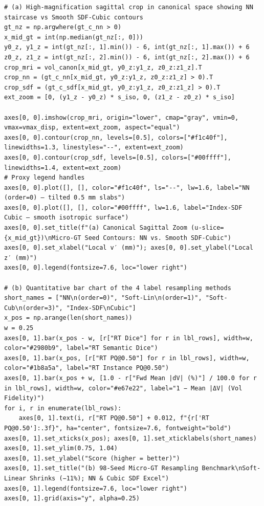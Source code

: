 \documentclass[10pt,a4paper]{article}
\renewcommand{\_}{\origunderscore\allowbreak}
\begin{document}
\begin{codebox}
\begin{lstlisting}[style=pybmed]
# (a) High-magnification sagittal crop in canonical space showing NN staircase vs Smooth SDF-Cubic contours
gt_nz = np.argwhere(gt_c_nn > 0)
x_mid_gt = int(np.median(gt_nz[:, 0]))
y0_z, y1_z = int(gt_nz[:, 1].min()) - 6, int(gt_nz[:, 1].max()) + 6
z0_z, z1_z = int(gt_nz[:, 2].min()) - 6, int(gt_nz[:, 2].max()) + 6
crop_mri = vol_canon[x_mid_gt, y0_z:y1_z, z0_z:z1_z].T
crop_nn = (gt_c_nn[x_mid_gt, y0_z:y1_z, z0_z:z1_z] > 0).T
crop_sdf = (gt_c_sdf[x_mid_gt, y0_z:y1_z, z0_z:z1_z] > 0).T
ext_zoom = [0, (y1_z - y0_z) * s_iso, 0, (z1_z - z0_z) * s_iso]

axes[0, 0].imshow(crop_mri, origin="lower", cmap="gray", vmin=0, vmax=vmax_disp, extent=ext_zoom, aspect="equal")
axes[0, 0].contour(crop_nn, levels=[0.5], colors=["#f1c40f"], linewidths=1.3, linestyles="--", extent=ext_zoom)
axes[0, 0].contour(crop_sdf, levels=[0.5], colors=["#00ffff"], linewidths=1.4, extent=ext_zoom)
# Proxy legend handles
axes[0, 0].plot([], [], color="#f1c40f", ls="--", lw=1.6, label="NN (order=0) — tilted 0.5 mm slabs")
axes[0, 0].plot([], [], color="#00ffff", lw=1.6, label="Index-SDF Cubic — smooth isotropic surface")
axes[0, 0].set_title(f"(a) Canonical Sagittal Zoom (u-slice={x_mid_gt})\nMicro-GT Seed Contours: NN vs. Smooth SDF-Cubic")
axes[0, 0].set_xlabel("Local v′ (mm)"); axes[0, 0].set_ylabel("Local z′ (mm)")
axes[0, 0].legend(fontsize=7.6, loc="lower right")

# (b) Quantitative bar chart of the 4 label resampling methods
short_names = ["NN\n(order=0)", "Soft-Lin\n(order=1)", "Soft-Cub\n(order=3)", "Index-SDF\nCubic"]
x_pos = np.arange(len(short_names))
w = 0.25
axes[0, 1].bar(x_pos - w, [r["RT Dice"] for r in lbl_rows], width=w, color="#2980b9", label="RT Semantic Dice")
axes[0, 1].bar(x_pos, [r["RT PQ@0.50"] for r in lbl_rows], width=w, color="#1b8a5a", label="RT Instance PQ@0.50")
axes[0, 1].bar(x_pos + w, [1.0 - r["Fwd Mean |dV| (%)"] / 100.0 for r in lbl_rows], width=w, color="#e67e22", label="1 − Mean |ΔV| (Vol Fidelity)")
for i, r in enumerate(lbl_rows):
    axes[0, 1].text(i, r["RT PQ@0.50"] + 0.012, f"{r['RT PQ@0.50']:.3f}", ha="center", fontsize=7.6, fontweight="bold")
axes[0, 1].set_xticks(x_pos); axes[0, 1].set_xticklabels(short_names)
axes[0, 1].set_ylim(0.75, 1.04)
axes[0, 1].set_ylabel("Score (higher = better)")
axes[0, 1].set_title("(b) 98-Seed Micro-GT Resampling Benchmark\nSoft-Linear Shrinks (−11%); NN & Cubic SDF Excel")
axes[0, 1].legend(fontsize=7.6, loc="lower right")
axes[0, 1].grid(axis="y", alpha=0.25)


\end{lstlisting}
\end{codebox}
\end{document}
